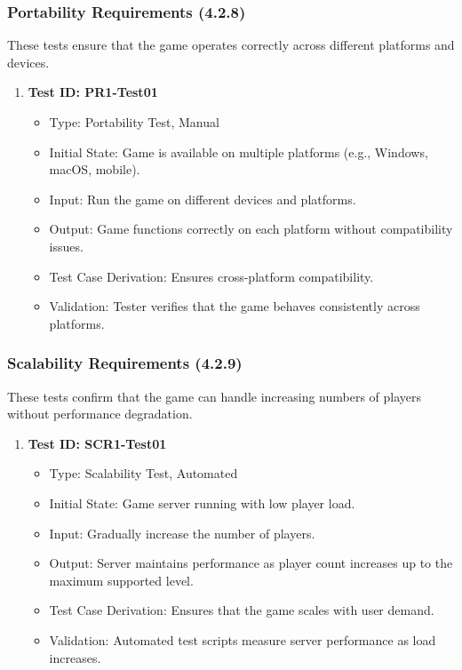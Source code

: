 \documentclass[12pt, titlepage]{article}
\begin{document}
\subsubsection{Portability Requirements (4.2.8)}

These tests ensure that the game operates correctly across different platforms and devices.

\begin{enumerate}
    \item \textbf{Test ID: PR1-Test01}
        \begin{itemize}
            \item Type: Portability Test, Manual
            \item Initial State: Game is available on multiple platforms (e.g., Windows, macOS, mobile).
            \item Input: Run the game on different devices and platforms.
            \item Output: Game functions correctly on each platform without compatibility issues.
            \item Test Case Derivation: Ensures cross-platform compatibility.
            \item Validation: Tester verifies that the game behaves consistently across platforms.
        \end{itemize}
\end{enumerate}

\subsubsection{Scalability Requirements (4.2.9)}

These tests confirm that the game can handle increasing numbers of players without performance degradation.

\begin{enumerate}
    \item \textbf{Test ID: SCR1-Test01}
        \begin{itemize}
            \item Type: Scalability Test, Automated
            \item Initial State: Game server running with low player load.
            \item Input: Gradually increase the number of players.
            \item Output: Server maintains performance as player count increases up to the maximum supported level.
            \item Test Case Derivation: Ensures that the game scales with user demand.
            \item Validation: Automated test scripts measure server performance as load increases.
        \end{itemize}
\end{enumerate}
\end{document}
